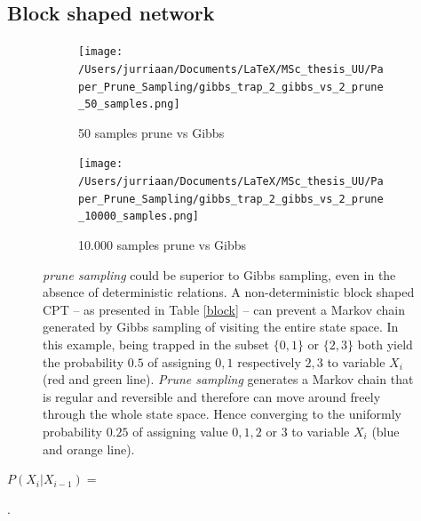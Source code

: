 \documentclass[a4paper, twoside, 11pt]{report}
\theoremstyle{plain}
\theoremstyle{definition}
\theoremstyle{remark}
\newcommand{\ps}{\textit{prune sampling }}
\begin{document}
\newpage
\subsection{Block shaped network}

\begin{figure}[h]
\centering
\begin{subfigure}{.49\textwidth}
  \centering
  \texttt{[image: /Users/jurriaan/Documents/LaTeX/MSc\_thesis\_UU/Paper\_Prune\_Sampling/gibbs\_trap\_2\_gibbs\_vs\_2\_prune\_50\_samples.png]}
  \caption{50 samples prune vs Gibbs}
  \label{fig:sub1}
\end{subfigure}
\begin{subfigure}{.49\textwidth}
  \centering
  \texttt{[image: /Users/jurriaan/Documents/LaTeX/MSc\_thesis\_UU/Paper\_Prune\_Sampling/gibbs\_trap\_2\_gibbs\_vs\_2\_prune\_10000\_samples.png]}
  \caption{10.000 samples prune vs Gibbs}
  \label{fig:sub2}
\end{subfigure}
\vspace{0.75pc}
\caption{\ps could be superior to Gibbs sampling, even in the absence of deterministic relations. A non-deterministic block shaped CPT -- as presented in Table \ref{block} -- can prevent a Markov chain generated by Gibbs sampling of visiting the entire state space. In this example, being trapped in the subset $\{0, 1\}$ or $\{2, 3\}$ both yield the probability $0.5$ of assigning $0,1$ respectively $2,3$ to variable $X_i$ (red and green line). \textit{Prune sampling} generates a Markov chain that is regular and reversible and therefore can move around freely through the whole state space. Hence converging to the uniformly probability $0.25$ of assigning value $0,1,2$ or $3$ to variable $X_i$ (blue and orange line).} 
\label{block-BN}
\end{figure}

\vspace{2pc}
$P(X_i |X_{i-1})=$
\begin{table}[h!]
\centering
{}.
\caption{a block shaped CPT}
\label{block}
\end{table}
\end{document}
